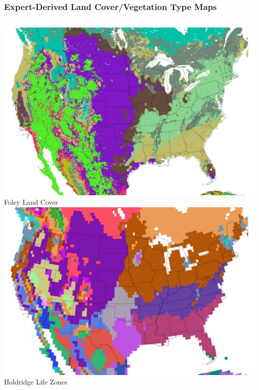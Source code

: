 \begin{frame}
 \frametitle{Expert-Derived Land Cover/Vegetation Type Maps}\scriptsize
 \begin{columns}[c]
  \begin{column}{0.45\textwidth}
   \begin{center}
   \vskip-0.20in
    \includegraphics[width=\textwidth]{figures/foleylandcover_gimp.pdf} \\
    Foley Land Cover \\
    \includegraphics[width=\textwidth]{figures/holdridgezonesnormal_gimp.pdf} \\
    Holdridge Life Zones \\
   \end{center}

\end{column}
\end{columns}
\end{frame}
